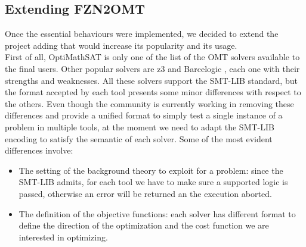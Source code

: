 \subsection{Extending FZN2OMT}

Once the essential behaviours were implemented, we decided to extend the project adding that would increase its popularity and its usage.\\
First of all, OptiMathSAT is only one of the list of the OMT solvers available to the final users. Other popular solvers are z3 \cite{pa17} and Barcelogic \cite{barcelogic}, each one with their strengths and weaknesses. All these solvers support the SMT-LIB standard, but the format accepted by each tool presents some minor differences with respect to the others. Even though the community is currently working in removing these differences and provide a unified format to simply test a single instance of a problem in multiple tools, at the moment we need to adapt the SMT-LIB encoding to satisfy the semantic of each solver. Some of the most evident differences involve:

\begin{itemize}
    \item The setting of the background theory to exploit for a problem: since the SMT-LIB admits, for each tool we have to make sure a supported logic is passed, otherwise an error will be returned an the execution aborted. 
    \item The definition of the objective functions: each solver has different format to define the direction of the optimization and the cost function we are interested in optimizing.
\end{itemize}

